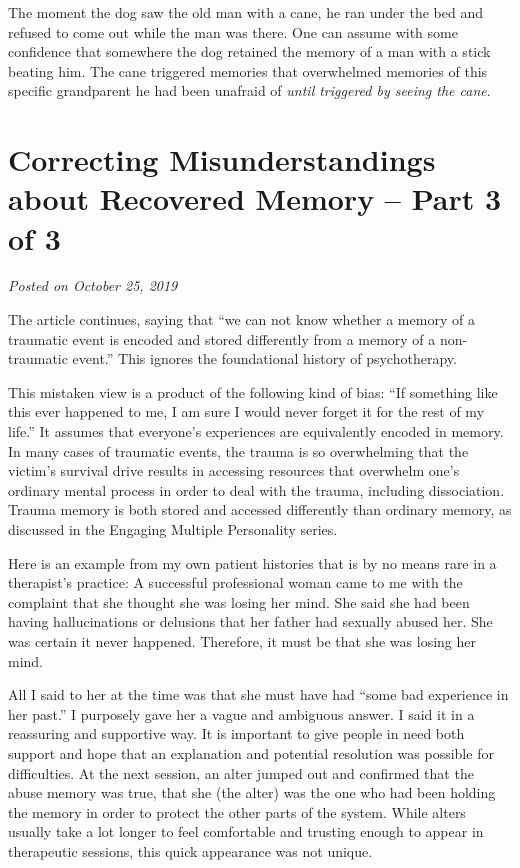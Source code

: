 \documentclass[]{book}
\begin{document}
The moment the dog saw the old man with a cane, he ran under the bed and refused to come out while the man was there. One can assume with some confidence that somewhere the dog retained the memory of a man with a stick beating him. The cane triggered memories that overwhelmed memories of this specific grandparent he had been unafraid of \emph{until triggered by seeing the cane}.

\hypertarget{correcting-misunderstandings-about-recovered-memory-part-3-of-3}{%
\section{Correcting Misunderstandings about Recovered Memory -- Part 3 of 3}\label{correcting-misunderstandings-about-recovered-memory-part-3-of-3}}

\emph{Posted on October 25, 2019}

The article continues, saying that ``we can not know whether a memory of a traumatic event is encoded and stored differently from a memory of a non-traumatic event.'' This ignores the foundational history of psychotherapy.

This mistaken view is a product of the following kind of bias: ``If something like this ever happened to me, I am sure I would never forget it for the rest of my life.'' It assumes that everyone's experiences are equivalently encoded in memory. In many cases of traumatic events, the trauma is so overwhelming that the victim's survival drive results in accessing resources that overwhelm one's ordinary mental process in order to deal with the trauma, including dissociation. Trauma memory is both stored and accessed differently than ordinary memory, as discussed in the Engaging Multiple Personality series.

Here is an example from my own patient histories that is by no means rare in a therapist's practice: A successful professional woman came to me with the complaint that she thought she was losing her mind. She said she had been having hallucinations or delusions that her father had sexually abused her. She was certain it never happened. Therefore, it must be that she was losing her mind.

All I said to her at the time was that she must have had ``some bad experience in her past.'' I purposely gave her a vague and ambiguous answer. I said it in a reassuring and supportive way. It is important to give people in need both support and hope that an explanation and potential resolution was possible for difficulties. At the next session, an alter jumped out and confirmed that the abuse memory was true, that she (the alter) was the one who had been holding the memory in order to protect the other parts of the system. While alters usually take a lot longer to feel comfortable and trusting enough to appear in therapeutic sessions, this quick appearance was not unique.
\end{document}

